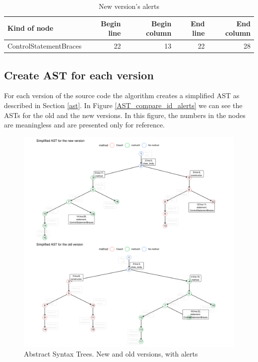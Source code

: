 \documentclass[
]{article}
\begin{document}
\normalsize

\small

\begin{table}[H]

\caption{\label{tab:unnamed-chunk-4}New version's alerts\label{new_alerts}}
\centering
\begin{tabular}[t]{l|r|r|r|r}
\hline
Kind of node & Begin line & Begin column & End line & End column\\
\hline
\rowcolor{gray!6}  ControlStatementBraces & 22 & 13 & 22 & 28\\
\hline
\end{tabular}
\end{table}

\normalsize

\subsection{Create AST for each version}

For each version of the source code the algorithm creates a simplified
AST as described in Section \ref{ast}. In Figure \ref{AST_compare_id_alerts}
we can see the ASTs for the old and the new versions. In this figure, the 
numbers in the nodes are meaningless and are presented only for reference.

\small

\begin{figure}[H]
\includegraphics[width=1\linewidth]{report_files/figure-latex/unnamed-chunk-5-1} \caption{Abstract Syntax Trees. New and old versions, with alerts \label{AST_compare_id_alerts}}\label{fig:unnamed-chunk-5}
\end{figure}
\end{document}
